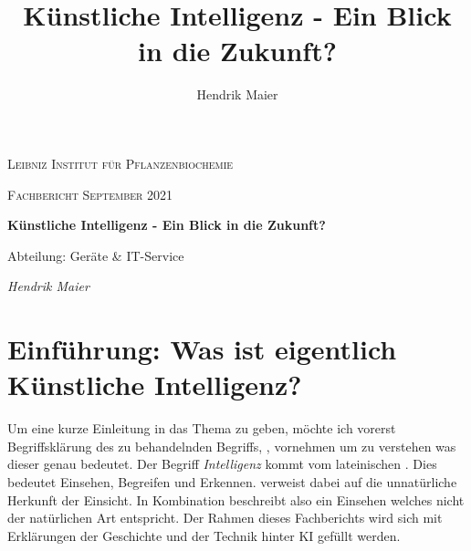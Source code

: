 \documentclass[12pt]{report}
\title{Künstliche Intelligenz - Ein Blick in die Zukunft?}
\author{Hendrik Maier}
\date{}
\begin{document}
    \begin{titlepage}
        \centering
        {\scshape\LARGE Leibniz Institut für Pflanzenbiochemie\par}
        \vspace{1cm}
        {\scshape\Large Fachbericht September 2021\par}
        \vspace{1.5cm}
        {\huge\bfseries Künstliche Intelligenz - Ein Blick in die Zukunft?\par}
        \vspace{2cm}
        {\Large Abteilung: Geräte \& IT-Service\par}
        \vspace{1.5cm}
        {\Large\itshape Hendrik Maier\par}
        \vfill

    \end{titlepage}

    \tableofcontents
    \newpage

    \chapter{Einführung: Was ist eigentlich Künstliche Intelligenz?}
    Um eine kurze Einleitung in das Thema zu geben, möchte ich vorerst Begriffsklärung des zu behandelnden Begriffs,
    , vornehmen um zu verstehen was dieser genau bedeutet.
    Der Begriff \emph{Intelligenz} kommt vom lateinischen . Dies bedeutet Einsehen, Begreifen und Erkennen.
     verweist dabei auf die unnatürliche Herkunft der Einsicht. In Kombination beschreibt 
    also ein Einsehen welches nicht der natürlichen Art entspricht. Der Rahmen dieses Fachberichts wird sich mit Erklärungen
    der Geschichte und der Technik hinter KI gefüllt werden.
    
\end{document}
